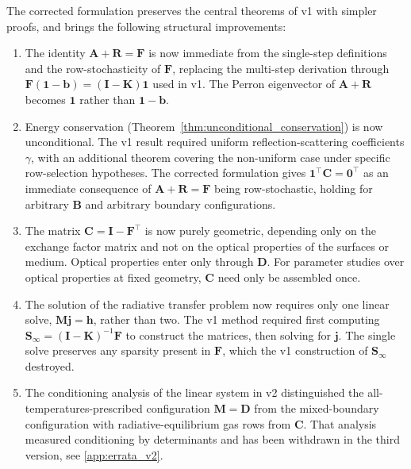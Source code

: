 \documentclass[preprint,1p,times]{elsarticle}
\theoremstyle{plain}
\theoremstyle{definition}
\theoremstyle{remark}
\begin{document}
The corrected formulation preserves the central theorems of v1 with simpler proofs, and brings the following structural improvements:
\begin{enumerate}
\item The identity $\mathbf{A} + \mathbf{R} = \mathbf{F}$ is now immediate from the single-step definitions and the row-stochasticity of $\mathbf{F}$, replacing the multi-step derivation through $\mathbf{F}(\mathbf{1}-\mathbf{b}) = (\mathbf{I}-\mathbf{K})\mathbf{1}$ used in v1. The Perron eigenvector of $\mathbf{A}+\mathbf{R}$ becomes $\mathbf{1}$ rather than $\mathbf{1}-\mathbf{b}$.
\item Energy conservation (Theorem~\ref{thm:unconditional_conservation}) is now unconditional. The v1 result required uniform reflection-scattering coefficients $\gamma$, with an additional theorem covering the non-uniform case under specific row-selection hypotheses. The corrected formulation gives $\mathbf{1}^\top\mathbf{C} = \mathbf{0}^\top$ as an immediate consequence of $\mathbf{A} + \mathbf{R} = \mathbf{F}$ being row-stochastic, holding for arbitrary $\mathbf{B}$ and arbitrary boundary configurations.
\item The matrix $\mathbf{C} = \mathbf{I} - \mathbf{F}^\top$ is now purely geometric, depending only on the exchange factor matrix and not on the optical properties of the surfaces or medium. Optical properties enter only through $\mathbf{D}$. For parameter studies over optical properties at fixed geometry, $\mathbf{C}$ need only be assembled once.
\item The solution of the radiative transfer problem now requires only one linear solve, $\mathbf{M}\mathbf{j} = \mathbf{h}$, rather than two. The v1 method required first computing $\mathbf{S}_\infty = (\mathbf{I} - \mathbf{K})^{-1}\mathbf{F}$ to construct the matrices, then solving for $\mathbf{j}$. The single solve preserves any sparsity present in $\mathbf{F}$, which the v1 construction of $\mathbf{S}_\infty$ destroyed.
\item The conditioning analysis of the linear system in v2 distinguished the all-temperatures-prescribed configuration $\mathbf{M}=\mathbf{D}$ from the mixed-boundary configuration with radiative-equilibrium gas rows from $\mathbf{C}$. That analysis measured conditioning by determinants and has been withdrawn in the third version, see \ref{app:errata_v2}.
\end{enumerate}
\end{document}
